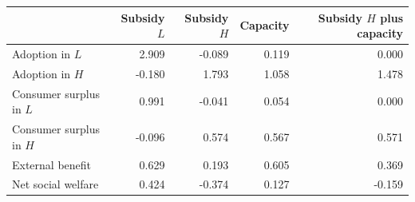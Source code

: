\begin{tabular*}{\linewidth}{@{\extracolsep{\fill}}lrrrr@{}}\toprule
& Subsidy $L$ & Subsidy $H$ & Capacity & \shortstack{Subsidy $H$\\plus capacity}\\
\midrule
Adoption in $L$ & 2.909 & -0.089 & 0.119 & 0.000\\
Adoption in $H$ & -0.180 & 1.793 & 1.058 & 1.478\\
\addlinespace[2pt]
Consumer surplus in $L$ & 0.991 & -0.041 & 0.054 & 0.000\\
Consumer surplus in $H$ & -0.096 & 0.574 & 0.567 & 0.571\\
External benefit & 0.629 & 0.193 & 0.605 & 0.369\\
\addlinespace[2pt]
Net social welfare & 0.424 & -0.374 & 0.127 & -0.159\\
\bottomrule
\end{tabular*}

